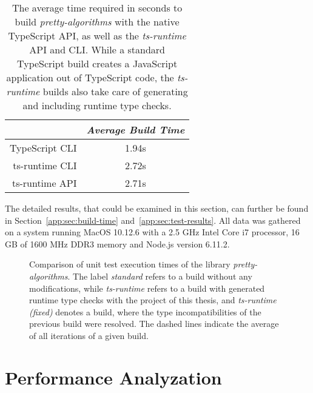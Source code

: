\begin{table}
\caption{The average time required in seconds to build \emph{pretty-algorithms} with the native TypeScript API, as well as the \emph{ts-runtime} API and CLI. While a standard TypeScript build creates a JavaScript application out of TypeScript code, the \emph{ts-runtime} builds also take care of generating and including runtime type checks.}
\label{tab:build-time}
\centering
\setlength{\tabcolsep}{5mm}
\def\arraystretch{1.25}
\small
\begin{tabular}{|r||c|}
    \hline
    & \emph{Average Build Time} \\
    \hline
    \hline
    TypeScript CLI & 1.94s \\
    \hline
    ts-runtime CLI & 2.72s \\
    \hline
    ts-runtime API & 2.71s \\
    \hline
  \end{tabular}
\end{table}
The detailed results, that could be examined in this section, can further be found in Section~\ref{app:sec:build-time} and~\ref{app:sec:test-results}. All data was gathered on a system running MacOS 10.12.6 with a 2.5 GHz Intel Core i7 processor, 16 GB of 1600 MHz DDR3 memory and Node.js version 6.11.2.
\begin{figure}
\centering

\caption{Comparison of unit test execution times of the library \emph{pretty-algorithms}. The label \emph{standard} refers to a build without any modifications, while \emph{ts-runtime} refers to a build with generated runtime type checks with the project of this thesis, and \emph{ts-runtime (fixed)} denotes a build, where the type incompatibilities of the previous build were resolved. The dashed lines indicate the average of all iterations of a given build.}
\label{fig:operational-test}
\end{figure}

\section{Performance Analyzation}
\label{sec:performance-analyzation}

